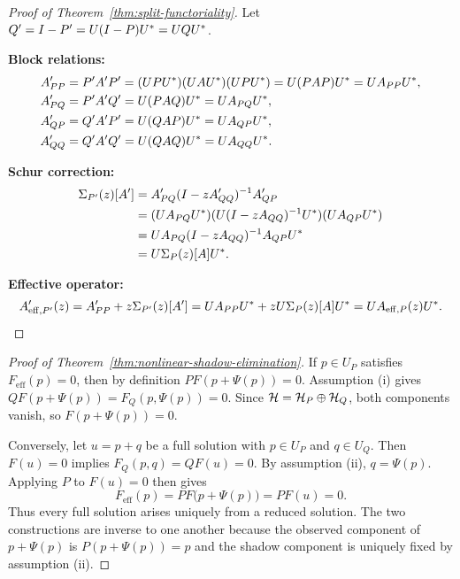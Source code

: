 \begin{proof}[Proof of Theorem~\ref{thm:split-functoriality}]
\label{proof:thm:split-functoriality}
Let $Q' = I - P' = U(I-P)U^* = UQ U^*$.

\medskip\noindent
\textbf{Block relations:}
\begin{align*}
A'_{PP} &= P' A' P' = (UPU^*)(UAU^*)(UPU^*) = U(PAP)U^* = U A_{PP} U^*, \\
A'_{PQ} &= P' A' Q' = U(PAQ)U^* = U A_{PQ} U^*, \\
A'_{QP} &= Q' A' P' = U(Q AP)U^* = U A_{QP} U^*, \\
A'_{QQ} &= Q' A' Q' = U(Q AQ)U^* = U A_{QQ} U^*.
\end{align*}

\medskip\noindent
\textbf{Schur correction:}
\begin{align*}
\Sigma_{P'}(z)[A'] &= A'_{PQ}(I - zA'_{QQ})^{-1}A'_{QP} \\
&= (U A_{PQ} U^*)(U(I - zA_{QQ})^{-1}U^*)(U A_{QP} U^*) \\
&= U A_{PQ}(I - zA_{QQ})^{-1}A_{QP} U^* \\
&= U \Sigma_{P}(z)[A] U^*.
\end{align*}

\medskip\noindent
\textbf{Effective operator:}
\[
A'_{\mathrm{eff},P'}(z) = A'_{PP} + z\Sigma_{P'}(z)[A'] = UA_{PP}U^* + zU\Sigma_{P}(z)[A]U^* = UA_{\mathrm{eff},P}(z)U^*.
\]
\end{proof}

\begin{proof}[Proof of Theorem~\ref{thm:nonlinear-shadow-elimination}]
\label{proof:thm:nonlinear-shadow-elimination}
If $p\in U_P$ satisfies $F_{\mathrm{eff}}(p)=0$, then by definition
$P F(p+\Psi(p))=0$. Assumption (i) gives
$QF(p+\Psi(p))=F_Q(p,\Psi(p))=0$. Since $\mathcal{H}=\mathcal{H}_P\oplus\mathcal{H}_Q$, both
components vanish, so $F(p+\Psi(p))=0$.

Conversely, let $u=p+q$ be a full solution with $p\in U_P$ and $q\in U_Q$.
Then $F(u)=0$ implies $F_Q(p,q)=QF(u)=0$. By assumption (ii), $q=\Psi(p)$.
Applying $P$ to $F(u)=0$ then gives
\[
F_{\mathrm{eff}}(p)=PF\bigl(p+\Psi(p)\bigr)=PF(u)=0.
\]
Thus every full solution arises uniquely from a reduced solution. The two
constructions are inverse to one another because the observed component of
$p+\Psi(p)$ is $P(p+\Psi(p))=p$ and the shadow component is uniquely fixed by
assumption (ii).
\end{proof}

